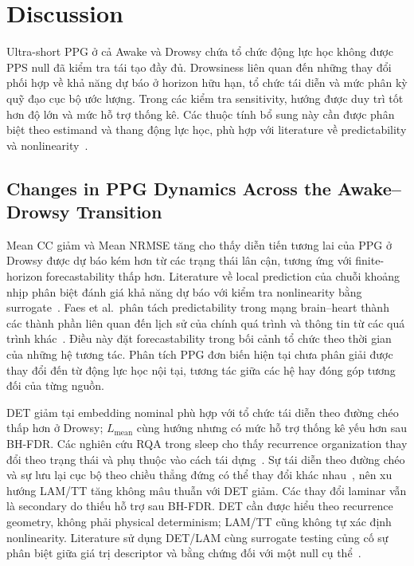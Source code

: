 \section{Discussion}

Ultra-short PPG ở cả Awake và Drowsy chứa tổ chức động lực học không được PPS null đã kiểm tra tái tạo đầy đủ. Drowsiness liên quan đến những thay đổi phối hợp về khả năng dự báo ở horizon hữu hạn, tổ chức tái diễn và mức phân kỳ quỹ đạo cục bộ ước lượng. Trong các kiểm tra sensitivity, hướng được duy trì tốt hơn độ lớn và mức hỗ trợ thống kê. Các thuộc tính bổ sung này cần được phân biệt theo estimand và thang động lực học, phù hợp với literature về predictability và nonlinearity~\cite{porta2007_prediction,porta2015,calderonjuarez2023,hu2009}.

\subsection{Changes in PPG Dynamics Across the Awake--Drowsy Transition}

Mean CC giảm và Mean NRMSE tăng cho thấy diễn tiến tương lai của PPG ở Drowsy được dự báo kém hơn từ các trạng thái lân cận, tương ứng với finite-horizon forecastability thấp hơn. Literature về local prediction của chuỗi khoảng nhịp phân biệt đánh giá khả năng dự báo với kiểm tra nonlinearity bằng surrogate~\cite{porta2007_prediction}. Faes et al.\ phân tách predictability trong mạng brain--heart thành các thành phần liên quan đến lịch sử của chính quá trình và thông tin từ các quá trình khác~\cite{faes2016}. Điều này đặt forecastability trong bối cảnh tổ chức theo thời gian của những hệ tương tác. Phân tích PPG đơn biến hiện tại chưa phân giải được thay đổi đến từ động lực học nội tại, tương tác giữa các hệ hay đóng góp tương đối của từng nguồn.

DET giảm tại embedding nominal phù hợp với tổ chức tái diễn theo đường chéo thấp hơn ở Drowsy; $L_{\mathrm{mean}}$ cùng hướng nhưng có mức hỗ trợ thống kê yếu hơn sau BH-FDR. Các nghiên cứu RQA trong sleep cho thấy recurrence organization thay đổi theo trạng thái và phụ thuộc vào cách tái dựng~\cite{rolink2015,martingonzalez2018}. Sự tái diễn theo đường chéo và sự lưu lại cục bộ theo chiều thẳng đứng có thể thay đổi khác nhau~\cite{martingonzalez2018}, nên xu hướng LAM/TT tăng không mâu thuẫn với DET giảm. Các thay đổi laminar vẫn là secondary do thiếu hỗ trợ sau BH-FDR. DET cần được hiểu theo recurrence geometry, không phải physical determinism; LAM/TT cũng không tự xác định nonlinearity. Literature sử dụng DET/LAM cùng surrogate testing củng cố sự phân biệt giữa giá trị descriptor và bằng chứng đối với một null cụ thể~\cite{calderonjuarez2023}.

